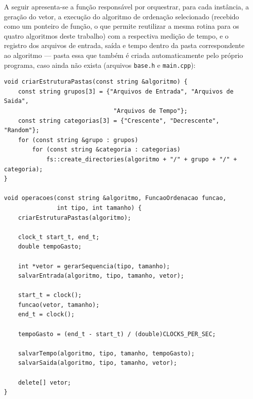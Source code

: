 \qquad A seguir apresenta-se a função responsável por orquestrar, para
cada instância, a geração do vetor, a execução do algoritmo de
ordenação selecionado (recebido como um ponteiro de função, o que
permite reutilizar a mesma rotina para os quatro algoritmos deste
trabalho) com a respectiva medição de tempo, e o registro dos
arquivos de entrada, saída e tempo dentro da pasta correspondente ao
algoritmo — pasta essa que também é criada automaticamente pelo
próprio programa, caso ainda não exista (arquivos
\texttt{base.h} e \texttt{main.cpp}):

\begin{verbatim}
void criarEstruturaPastas(const string &algoritmo) {
    const string grupos[3] = {"Arquivos de Entrada", "Arquivos de Saida",
                               "Arquivos de Tempo"};
    const string categorias[3] = {"Crescente", "Decrescente", "Random"};
    for (const string &grupo : grupos)
        for (const string &categoria : categorias)
            fs::create_directories(algoritmo + "/" + grupo + "/" + categoria);
}

void operacoes(const string &algoritmo, FuncaoOrdenacao funcao,
               int tipo, int tamanho) {
    criarEstruturaPastas(algoritmo);

    clock_t start_t, end_t;
    double tempoGasto;

    int *vetor = gerarSequencia(tipo, tamanho);
    salvarEntrada(algoritmo, tipo, tamanho, vetor);

    start_t = clock();
    funcao(vetor, tamanho);
    end_t = clock();

    tempoGasto = (end_t - start_t) / (double)CLOCKS_PER_SEC;

    salvarTempo(algoritmo, tipo, tamanho, tempoGasto);
    salvarSaida(algoritmo, tipo, tamanho, vetor);

    delete[] vetor;
}
\end{verbatim}

